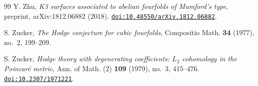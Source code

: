 \begin{thebibliography}{99}
Y. Zhu,
\emph{K3 surfaces associated to abelian fourfolds of Mumford's type},
preprint, arXiv:1812.06882 (2018).
\href{https://doi.org/10.48550/arXiv.1812.06882}{\texttt{doi:10.48550/arXiv.1812.06882}}.

S. Zucker,
\emph{The Hodge conjecture for cubic fourfolds},
Compositio Math. \textbf{34} (1977), no.~2, 199--209.

S. Zucker,
\emph{Hodge theory with degenerating coefficients: $L_{2}$ cohomology in the
Poincar\'e metric},
Ann. of Math. (2) \textbf{109} (1979), no.~3, 415--476.
\href{https://doi.org/10.2307/1971221}{\texttt{doi:10.2307/1971221}}.

\end{thebibliography}
